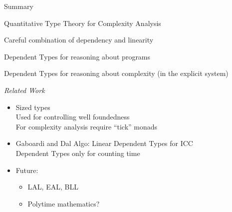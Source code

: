 \documentclass[xetex,serif,mathserif,aspectratio=169]{beamer}
\newcommand{\titlecard}[1]{\begin{frame}%
  \begin{center}%
    \Large \textcolor{titlered}{#1}%
  \end{center}%
\end{frame}}
\begin{document}




\titlecard{Summary}

\begin{frame}


  \point Quantitative Type Theory for Complexity Analysis\\

  \bigskip

  \point Careful combination of dependency and linearity\\

  \bigskip

  \point Dependent Types for reasoning about programs \\

  \bigskip

  \point Dependent Types for reasoning about complexity (in the explicit system)

  \pause
  \bigskip

  {\it Related Work}
  \begin{itemize}
  \item Sized types \\
    \textcolor{black!60}{Used for controlling well foundedness} \\
    \textcolor{black!60}{For complexity analysis require ``tick'' monads} \\
  \item Gaboardi and Dal Algo: Linear Dependent Types for ICC \\
    \textcolor{black!60}{Dependent Types only for counting time}
  \item Future:
    \begin{itemize}
    \item LAL, EAL, BLL
    \item Polytime mathematics?
    \end{itemize}
  \end{itemize}
\end{frame}
\end{document}
